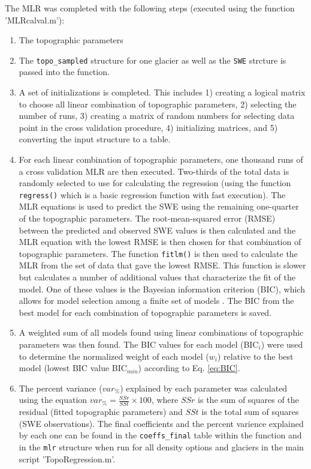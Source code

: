 \documentclass[12pt]{article}
\begin{document}
The MLR was completed with the following steps (executed using the function 'MLRcalval.m'):
\begin{enumerate}
\item The topographic parameters 

\item The \texttt{topo\_sampled} structure for one glacier as well as the \texttt{SWE} strcture is passed into the function.

\item A set of initializations is completed. This includes 1) creating a logical matrix to choose all linear combination of topographic parameters, 2) selecting the number of runs, 3) creating a matrix of random numbers for selecting data point in the cross validation procedure, 4) initializing matrices, and 5) converting the input structure to a table.

\item For each linear combination of topographic parameters, one thousand runs of a cross validation MLR are then executed. Two-thirds of the total data is randomly selected \citep{Kohavi1995} to use for calculating the regression (using the function \texttt{regress()} which is a basic regression function with fast execution). The MLR equations is used to predict the SWE using the remaining one-quarter of the topographic parameters. The root-mean-squared error (RMSE) between the predicted and observed SWE values is then calculated and the MLR equation with the lowest RMSE is then chosen for that combination of topographic parameters. The function \texttt{fitlm()} is then used to calculate the MLR from the set of data that gave the lowest RMSE. This function is slower but calculates a number of additional values that characterize the fit of the model. One of these values is the Bayesian information criterion (BIC), which allows for model selection among a finite set of models \citep{Burnham2004}. The BIC from the best model for each combination of topographic parameters is saved.

\item A weighted sum of all models found using linear combinations of topographic parameters was then found. The BIC values for each model (BIC$_i$) were used to determine the normalized weight of each model ($w_i$) relative to the best model (lowest BIC value BIC$_{min}$) according to Eq. \ref{eq:BIC}.

\item The percent variance ($var_\%$) explained by each parameter was calculated using the equation $var_\% = \frac{SSr}{SSt}\times 100$, where $SSr$ is the sum of squares of the residual (fitted topographic parameters) and $SSt$ is the total sum of squares (SWE observations). The final coefficients and the percent varience explained by each one can be found in the \texttt{coeffs\_final} table within the function and in the \texttt{mlr} structure when run for all density options and glaciers in the main script 'TopoRegression.m'.


\end{enumerate}
\end{document}
